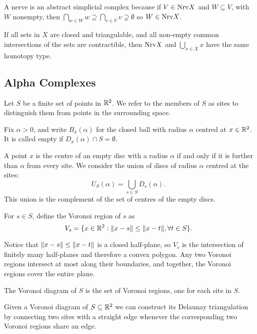A nerve is an abstract simplicial complex because if $V \in \textrm{Nrv} X$ and $W \subseteq V$, with $W$ nonempty, then $\bigcap_{w \in W} w \supseteq \bigcap_{v \in V} v \supsetneq \emptyset$ so $W \in \textrm{Nrv} X$.


\begin{theorem}
If all sets in $X$ are closed and triangulable, and all non-empty common intersections of the sets are contractible, then $\textrm{Nrv} X$ and $\bigcup_{x \in X} x$ have the same homotopy type.
\end{theorem}




\subsection{Alpha Complexes}


Let $S$ be a finite set of points in $\mathbb{R}^2$. We refer to the members of $S$ as sites to distinguish them from points in the surrounding space.


Fix $\alpha > 0$, and write $B_x(\alpha)$ for the closed ball with radius $\alpha$ centred at $x \in \mathbb{R}^2$. It is called empty if $D_x(\alpha) \cap S = \emptyset$.


A point $x$ is the centre of an empty disc with a radius $\alpha$ if and only if it is further than $\alpha$ from every site. We consider the union of discs of radius $\alpha$ centred at the sites:
$$
U_S(\alpha) = \bigcup_{s \in S} D_s(\alpha).
$$
This union is the complement of the set of centres of the empty discs.


\begin{definition}
For $s \in S$, define the Voronoi region of $s$ as
$$
V_s = \{x \in \mathbb{R}^2 : \lVert x-s\rVert \leq \lVert x-t\rVert, \forall t \in S\}.
$$
\end{definition}


Notice that $\lVert x - s\rVert \leq \lVert x - t\rVert$ is a closed half-plane, so $V_s$ is the intersection of finitely many half-planes and therefore a convex polygon. Any two Voronoi regions intersect at most along their boundaries, and together, the Voronoi regions cover the entire plane.


\begin{definition}
The Voronoi diagram of $S$ is the set of Voronoi regions, one for each site in $S$.
\end{definition}


\begin{definition}
Given a Voronoi diagram of $S \subseteq \mathbb{R}^2$ we can construct its Delaunay triangulation by connecting two sites with a straight edge whenever the corresponding two Voronoi regions share an edge.
\end{definition}


